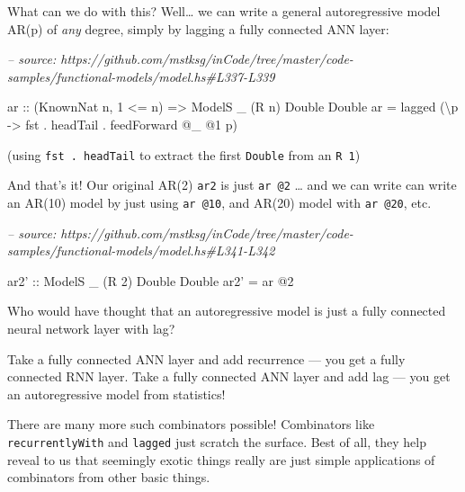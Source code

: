 \documentclass[]{article}
\newenvironment{Shaded}{}{}
\newcommand{\CommentTok}[1]{\textcolor[rgb]{0.38,0.63,0.69}{\textit{#1}}}
\newcommand{\DataTypeTok}[1]{\textcolor[rgb]{0.56,0.13,0.00}{#1}}
\newcommand{\DecValTok}[1]{\textcolor[rgb]{0.25,0.63,0.44}{#1}}
\newcommand{\FunctionTok}[1]{\textcolor[rgb]{0.02,0.16,0.49}{#1}}
\newcommand{\NormalTok}[1]{#1}
\newcommand{\OtherTok}[1]{\textcolor[rgb]{0.00,0.44,0.13}{#1}}
\begin{document}
What can we do with this? Well\ldots{} we can write a general autoregressive
model AR(p) of \emph{any} degree, simply by lagging a fully connected ANN layer:

\begin{Shaded}
\begin{Highlighting}[]
\CommentTok{-- source: https://github.com/mstksg/inCode/tree/master/code-samples/functional-models/model.hs#L337-L339}

\OtherTok{ar ::}\NormalTok{ (}\DataTypeTok{KnownNat}\NormalTok{ n, }\DecValTok{1} \FunctionTok{<=}\NormalTok{ n)}
   \OtherTok{=>} \DataTypeTok{ModelS}\NormalTok{ _ (}\DataTypeTok{R}\NormalTok{ n) }\DataTypeTok{Double} \DataTypeTok{Double}
\NormalTok{ar }\FunctionTok{=}\NormalTok{ lagged (\textbackslash{}p }\OtherTok{->}\NormalTok{ fst }\FunctionTok{.}\NormalTok{ headTail }\FunctionTok{.}\NormalTok{ feedForward }\FunctionTok{@}\NormalTok{_ }\FunctionTok{@}\DecValTok{1}\NormalTok{ p)}
\end{Highlighting}
\end{Shaded}

(using \texttt{fst\ .\ headTail} to extract the first \texttt{Double} from an
\texttt{R\ 1})

And that's it! Our original AR(2) \texttt{ar2} is just \texttt{ar\ @2} \ldots{}
and we can write can write an AR(10) model by just using \texttt{ar\ @10}, and
AR(20) model with \texttt{ar\ @20}, etc.

\begin{Shaded}
\begin{Highlighting}[]
\CommentTok{-- source: https://github.com/mstksg/inCode/tree/master/code-samples/functional-models/model.hs#L341-L342}

\OtherTok{ar2' ::} \DataTypeTok{ModelS}\NormalTok{ _ (}\DataTypeTok{R} \DecValTok{2}\NormalTok{) }\DataTypeTok{Double} \DataTypeTok{Double}
\NormalTok{ar2' }\FunctionTok{=}\NormalTok{ ar }\FunctionTok{@}\DecValTok{2}
\end{Highlighting}
\end{Shaded}

Who would have thought that an autoregressive model is just a fully connected
neural network layer with lag?

Take a fully connected ANN layer and add recurrence --- you get a fully
connected RNN layer. Take a fully connected ANN layer and add lag --- you get an
autoregressive model from statistics!

There are many more such combinators possible! Combinators like
\texttt{recurrentlyWith} and \texttt{lagged} just scratch the surface. Best of
all, they help reveal to us that seemingly exotic things really are just simple
applications of combinators from other basic things.
\end{document}
